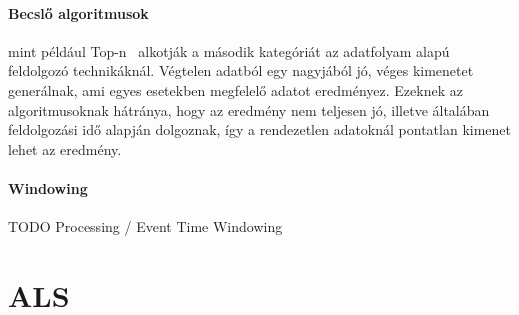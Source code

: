 \documentclass[a4paper,12pt]{article}
\begin{document}
\paragraph{Becslő algoritmusok} mint például Top-n~\cite{topn} alkotják a második kategóriát az adatfolyam alapú feldolgozó technikáknál. Végtelen adatból egy nagyjából jó, véges kimenetet generálnak, ami egyes esetekben megfelelő adatot eredményez. Ezeknek az algoritmusoknak hátránya, hogy az eredmény nem teljesen jó, illetve általában feldolgozási idő alapján dolgoznak, így a rendezetlen adatoknál pontatlan kimenet lehet az eredmény.

\paragraph{Windowing} 
TODO Processing / Event Time Windowing

\section{ALS}

\end{document}
